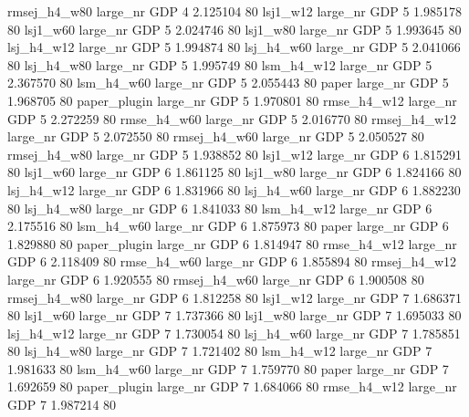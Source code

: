 rmsej_h4_w80   large_nr      GDP                 4 2.125104 80
    lsj1_w12   large_nr      GDP                 5 1.985178 80
    lsj1_w60   large_nr      GDP                 5 2.024746 80
    lsj1_w80   large_nr      GDP                 5 1.993645 80
  lsj_h4_w12   large_nr      GDP                 5 1.994874 80
  lsj_h4_w60   large_nr      GDP                 5 2.041066 80
  lsj_h4_w80   large_nr      GDP                 5 1.995749 80
  lsm_h4_w12   large_nr      GDP                 5 2.367570 80
  lsm_h4_w60   large_nr      GDP                 5 2.055443 80
       paper   large_nr      GDP                 5 1.968705 80
paper_plugin   large_nr      GDP                 5 1.970801 80
 rmse_h4_w12   large_nr      GDP                 5 2.272259 80
 rmse_h4_w60   large_nr      GDP                 5 2.016770 80
rmsej_h4_w12   large_nr      GDP                 5 2.072550 80
rmsej_h4_w60   large_nr      GDP                 5 2.050527 80
rmsej_h4_w80   large_nr      GDP                 5 1.938852 80
    lsj1_w12   large_nr      GDP                 6 1.815291 80
    lsj1_w60   large_nr      GDP                 6 1.861125 80
    lsj1_w80   large_nr      GDP                 6 1.824166 80
  lsj_h4_w12   large_nr      GDP                 6 1.831966 80
  lsj_h4_w60   large_nr      GDP                 6 1.882230 80
  lsj_h4_w80   large_nr      GDP                 6 1.841033 80
  lsm_h4_w12   large_nr      GDP                 6 2.175516 80
  lsm_h4_w60   large_nr      GDP                 6 1.875973 80
       paper   large_nr      GDP                 6 1.829880 80
paper_plugin   large_nr      GDP                 6 1.814947 80
 rmse_h4_w12   large_nr      GDP                 6 2.118409 80
 rmse_h4_w60   large_nr      GDP                 6 1.855894 80
rmsej_h4_w12   large_nr      GDP                 6 1.920555 80
rmsej_h4_w60   large_nr      GDP                 6 1.900508 80
rmsej_h4_w80   large_nr      GDP                 6 1.812258 80
    lsj1_w12   large_nr      GDP                 7 1.686371 80
    lsj1_w60   large_nr      GDP                 7 1.737366 80
    lsj1_w80   large_nr      GDP                 7 1.695033 80
  lsj_h4_w12   large_nr      GDP                 7 1.730054 80
  lsj_h4_w60   large_nr      GDP                 7 1.785851 80
  lsj_h4_w80   large_nr      GDP                 7 1.721402 80
  lsm_h4_w12   large_nr      GDP                 7 1.981633 80
  lsm_h4_w60   large_nr      GDP                 7 1.759770 80
       paper   large_nr      GDP                 7 1.692659 80
paper_plugin   large_nr      GDP                 7 1.684066 80
 rmse_h4_w12   large_nr      GDP                 7 1.987214 80
